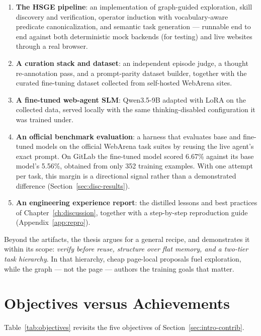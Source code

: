 \begin{enumerate}
  \item \textbf{The HSGE pipeline}: an implementation of graph-guided
  exploration, skill discovery and verification, operator induction with
  vocabulary-aware predicate canonicalization, and semantic task generation
  --- runnable end to end against both deterministic mock backends (for
  testing) and live websites through a real browser.
  \item \textbf{A curation stack and dataset}: an independent episode judge,
  a thought re-annotation pass, and a prompt-parity dataset builder, together
  with the curated fine-tuning dataset collected from self-hosted WebArena
  sites.
  \item \textbf{A fine-tuned web-agent SLM}: Qwen3.5-9B adapted with LoRA on
  the collected data, served locally with the same thinking-disabled
  configuration it was trained under.
  \item \textbf{An official benchmark evaluation}: a harness that evaluates
  base and fine-tuned models on the official WebArena task suites by reusing
  the live agent's exact prompt. On GitLab the fine-tuned model scored 6.67\%
  against its base model's 5.56\%, obtained from only 352 training examples.
  With one attempt per task, this margin is a directional signal rather than
  a demonstrated difference (Section~\ref{sec:disc-results}).
  \item \textbf{An engineering experience report}: the distilled lessons and
  best practices of Chapter~\ref{ch:discussion}, together with a
  step-by-step reproduction guide (Appendix~\ref{app:repro}).
\end{enumerate}

Beyond the artifacts, the thesis argues for a general recipe, and
demonstrates it within its scope: \emph{verify before reuse, structure over
flat memory, and a two-tier task hierarchy}. In that hierarchy, cheap
page-local proposals fuel exploration, while the graph --- not the page ---
authors the training goals that matter.

\section{Objectives versus Achievements}
\label{sec:conc-objectives}

Table~\ref{tab:objectives} revisits the five objectives of
Section~\ref{sec:intro-contrib}.

